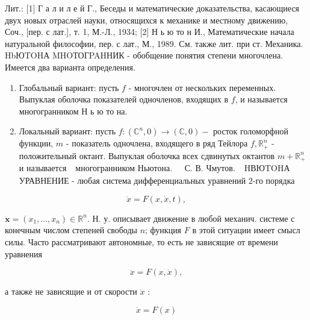 \documentclass[10pt]{article}
\begin{document}
Лит.: [1] Г а л и л е й Г., Беседы и математические доказательства, касающиеся двух новых отраслей науки, относящихся к механике и местному движению, Соч., [пер. с лат.], т. 1, М.-Л., 1934; [2] Н ь ю то н И., Математические начала натуральной философии, пер. с лат., М., 1989. См. также лит. при ст. Механика. HbЮTOHА MHOТОГPAHНИК - обобщение понятия степени многочлена. Имеется два варианта определения.



\begin{enumerate}

  \item Глобальный вариант: пусть $f$ - многочлен от нескольких переменных. Выпуклая оболочка показателей одночленов, входящих в $f$, и называется многогранником Н ь ю то на.



  \item Локальный вариант: пусть $f:\left(\mathbb{C}^{n}, 0\right) \rightarrow(\mathbb{C}, 0)-$ росток голоморфной функции, $m$ - показатель одночлена, входящего в ряд Тейлора $f, \mathbb{R}_{+}^{n}$ - положительный октант. Выпуклая оболочка всех сдвинутых октантов $m+\mathbb{R}_{+}^{n}$ и называется $\begin{array}{lll}\text { многогранником Ньютона. } & \text { С. В. Чмутов. }\end{array}$ HВЮTOHА УРАВНЕНИЕ - любая система дифференциальных уравнений 2-го порядка



\end{enumerate}



\[

\ddot{x}=F(x, \dot{x}, t),

\]



$\boldsymbol{x}=\left(x_{1}, \ldots, x_{n}\right) \in \mathbb{R}^{n}$. Н. у. описывает движение в любой механич. системе с конечным числом степеней свободы $n$; функция $F$ в этой ситуации имеет смысл силы. Часто рассматривают автономные, то есть не зависящие от времени уравнения



\[

\ddot{x}=F(x, \dot{x}),

\]



а также не зависящие и от скорости $\dot{x}$ :



\[

\ddot{x}=F(x)

\]
\end{document}

